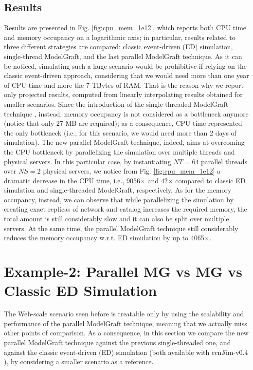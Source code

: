 \documentclass[10pt]{article}
\newcommand{\ccnsim}{ccn\ensuremath{\mathcal{S}}im} %
\begin{document}
\subsection*{Results}
Results are presented in Fig. \ref{fig:cpu_mem_1e12}, which reports both CPU time and memory occupancy on a logarithmic axis; in particular, results related to three different strategies are compared: classic event-driven (ED) simulation, single-thread ModelGraft, and the last parallel ModelGraft technique. 
As it can be noticed, simulating such a huge scenario would be prohibitive if relying on the classic event-driven approach, considering that we would need more than one year of CPU time and more the 7 TBytes of RAM. That is the reason why we report only projected results, computed from linearly interpolating results obtained for smaller scenarios. Since the introduction of the single-threaded ModelGraft technique \cite{tortelli-comnet:17}, instead, memory occupancy is not considered as a bottleneck anymore (notice that only 27 MB are required); as a consequence, CPU time represented the only bottleneck (i.e., for this scenario, we would need more than 2 days of simulation). 
The new parallel ModelGraft technique, indeed, aims at overcoming the CPU bottleneck by parallelizing the simulation over multiple threads and physical servers. In this particular case, by instantiating $NT=64$ parallel threads over $NS=2$ physical servers, we notice from Fig. \ref{fig:cpu_mem_1e12} a dramatic decrease in the CPU time, i.e., 9056$\times$ and 42$\times$ compared to classic ED simulation and single-threaded ModelGraft, respectively. As for the memory occupancy, instead, we can observe that while parallelizing the simulation by creating exact replicas of network and catalog increases the required memory, the total amount is still considerably slow and it can also be split over multiple servers. At the same time, the parallel ModelGraft technique still considerably reduces the memory occupancy w.r.t. ED simulation by up to 4065$\times$. 


\section*{Example-2: Parallel MG vs MG vs Classic ED Simulation}
The Web-scale scenario seen before is treatable only by using the scalability and performance of the parallel ModelGraft technique, meaning that we actually miss other points of comparison. As a consequence, in this section we compare the new parallel ModelGraft technique against the previous single-threaded one, and against the classic event-driven (ED) simulation (both available with \ccnsim-v0.4 \cite{ccnSim}), by considering a smaller scenario as a reference. 
\end{document}
